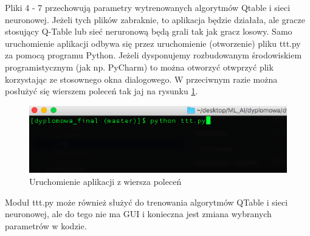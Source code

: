 \documentclass[licencjacka]{pracamgr}
\begin{document}
Pliki 4 - 7 przechowują parametry wytrenowanych algorytmów Qtable i sieci neuronowej. Jeżeli tych plików zabraknie, to aplikacja będzie działała, ale gracze stosujący Q-Table lub sieć neruronową będą grali tak jak gracz losowy. Samo uruchomienie aplikacji odbywa się przez uruchomienie (otworzenie) pliku ttt.py za pomocą programu Python. Jeżeli dysponujemy rozbudowanym środowiskiem programistycznym (jak np. PyCharm) to można otworzyć otwprzyć plik korzystając ze stosownego okna dialogowego. W przeciwnym razie można posłużyć się wierszem poleceń tak jaj na rysunku \ref{Rys35}. 


\begin{figure}[h!]
	\includegraphics [scale=0.5] {uruchamianie.png}
	\caption{Uruchomienie aplikacji z wiersza poleceń}
	\label{Rys35}
\end{figure} 


Moduł ttt.py może również służyć do trenowania algorytmów QTable i sieci neuronowej, ale do tego nie ma GUI i konieczna jest zmiana wybranych parametrów w kodzie. 
\end{document}
